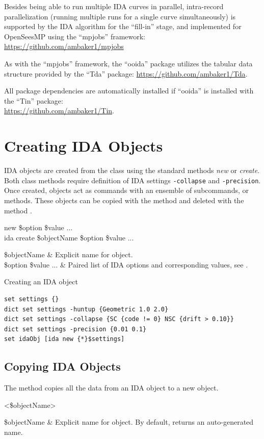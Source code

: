 \documentclass{article}
\renewcommand{\^}[1]{\textsuperscript{#1}}
\renewcommand{\_}[1]{\textsubscript{#1}}
\begin{document}
Besides being able to run multiple IDA curves in parallel, intra-record parallelization (running multiple runs for a single curve simultaneously) is supported by the IDA algorithm for the ``fill-in'' stage, and implemented for OpenSeesMP using the ``mpjobs'' framework: \url{https://github.com/ambaker1/mpjobs}

As with the ``mpjobs'' framework, the ``ooida'' package utilizes the tabular data structure provided by the ``Tda'' package:
\url{https://github.com/ambaker1/Tda}.

All package dependencies are automatically installed if ``ooida'' is installed with the ``Tin'' package: \\\url{https://github.com/ambaker1/Tin}.

\clearpage
\section{Creating IDA Objects}
IDA objects are created from the  class using the standard methods \textit{new} or \textit{create}.
Both class methods require definition of IDA settings \texttt{-collapse} and \texttt{-precision}. 
Once created,  objects act as commands with an ensemble of subcommands, or methods. 
These objects can be copied with the method  and deleted with the method .
\begin{syntax}
 new \$option \$value ... \\
ida create \$objectName \$option \$value ...
\end{syntax}
\begin{args}
\$objectName & Explicit name for object. \\
\$option \$value ... & Paired list of IDA options and corresponding values, see .
\end{args}
\begin{example}{Creating an IDA object}
\begin{lstlisting}
set settings {}
dict set settings -huntup {Geometric 1.0 2.0}
dict set settings -collapse {SC {code != 0} NSC {drift > 0.10}}
dict set settings -precision {0.01 0.1}
set idaObj [ida new {*}$settings]
\end{lstlisting}
\end{example}

\subsection{Copying IDA Objects}
The method  copies all the data from an IDA object to a new object.
\begin{syntax}
 <\$objectName>
\end{syntax}
\begin{args}
\$objectName & Explicit name for object. By default, returns an auto-generated name.
\end{args}
\end{document}
